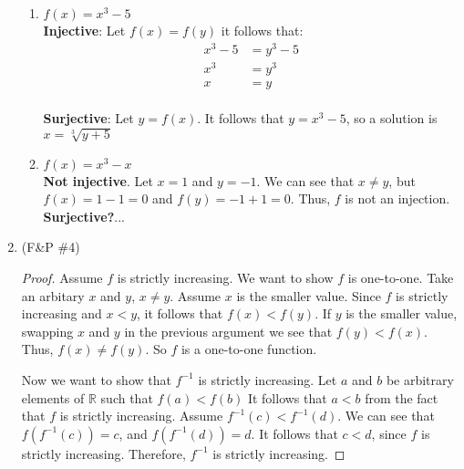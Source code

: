 \documentclass{article}
\theoremstyle{problem}
\theoremstyle{plain}
\theoremstyle{remark}
\begin{document}
\begin{enumerate}
\begin{enumerate}
    \item $f(x) = x^3 - 5$\\
      \textbf{Injective}: Let $f(x) = f(y)$ it follows that:
      \begin{align*}
        x^3 - 5 &= y^3 - 5\\
        x^3 &= y^3\\
        x &= y
      \end{align*}\\
      \textbf{Surjective}: Let $y = f(x)$. It follows that $y = x^3 - 5$, so a solution is $x = \displaystyle \sqrt[3]{y + 5}$

    \item $f(x) = x^3 - x$\\
      \textbf{Not injective}. Let $x = 1$ and $y = -1$. We can see that $x \not = y$, but $f(x) = 1 - 1 = 0$ and $f(y) = -1 + 1 = 0$. Thus, $f$ is not an injection.\\
      \textbf{Surjective?}...      
    \end{enumerate}

    \item (F\&P {\small \#}4)\\[-.7cm]
      \begin{proof}
        Assume $f$ is strictly increasing. 
        We want to show $f$ is one-to-one. 
        Take an arbitary $x$ and $y$, $x \not = y$. 
        Assume $x$ is the smaller value.
        Since $f$ is strictly increasing and $x < y$, it follows that $f(x) < f(y)$.
        If $y$ is the smaller value, 
        swapping $x$ and $y$ in the previous argument we see that $f(y) < f(x)$.
        Thus, $f(x) \not = f(y)$. 
        So $f$ is a one-to-one function. 

        Now we want to show that $f^{-1}$ is strictly increasing. 
        Let $a$ and $b$ be arbitrary elements of $\mathbb{R}$ such that $f(a) < f(b)$
        It follows that $a < b$ from the fact that $f$ is strictly increasing.
        Assume $f^{-1}(c) < f^{-1}(d)$.
        We can see that $f(f^{-1}(c)) = c$, and $f(f^{-1}(d)) = d$.
        It follows that $c < d$, since $f$ is strictly increasing.
        Therefore, $f^{-1}$ is strictly increasing.
      \end{proof}


\end{enumerate}
\end{document}
